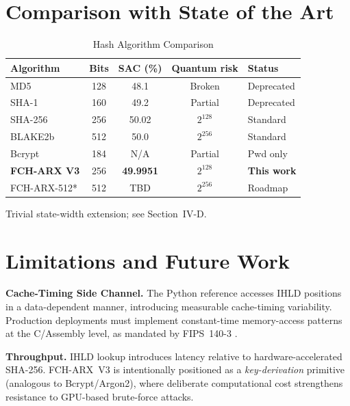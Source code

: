 \documentclass[12pt,journal]{IEEEtran}
\begin{document}
\section{Comparison with State of the Art}

\begin{table}[H]
\centering
\caption{Hash Algorithm Comparison}
\label{tab:comparison}
\renewcommand{\arraystretch}{1.3}
\begin{tabular}{lcccl}
\toprule
\textbf{Algorithm} & \textbf{Bits} & \textbf{SAC (\%)} &
  \textbf{Quantum risk} & \textbf{Status} \\
\midrule
MD5          & 128 & 48.1  & Broken       & Deprecated \\
SHA-1        & 160 & 49.2  & Partial      & Deprecated \\
SHA-256      & 256 & 50.02 & $2^{128}$    & Standard   \\
BLAKE2b      & 512 & 50.0  & $2^{256}$    & Standard   \\
Bcrypt       & 184 & N/A   & Partial      & Pwd only   \\
\midrule
\textbf{FCH-ARX V3} & 256 & \textbf{49.9951} & $2^{128}$ & \textbf{This work} \\
FCH-ARX-512* & 512 & TBD   & $2^{256}$    & Roadmap    \\
\bottomrule
\end{tabular}
\end{table}

\noindent *Trivial state-width extension; see Section~IV-D.

\section{Limitations and Future Work}

\textbf{Cache-Timing Side Channel.}
The Python reference accesses IHLD positions in a data-dependent manner,
introducing measurable cache-timing variability. Production deployments must
implement constant-time memory-access patterns at the C/Assembly level, as
mandated by FIPS~140-3 \cite{fips140}.

\textbf{Throughput.}
IHLD lookup introduces latency relative to hardware-accelerated SHA-256.
FCH-ARX~V3 is intentionally positioned as a \emph{key-derivation} primitive
(analogous to Bcrypt/Argon2), where deliberate computational cost strengthens
resistance to GPU-based brute-force attacks.
\end{document}
